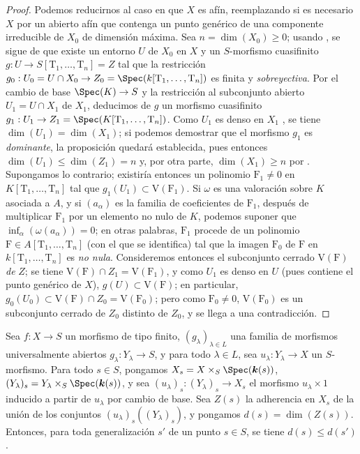 \begin{proof}
Podemos reducirnos al caso en que $X$ es afín, reemplazando si es necesario $X$ por un abierto afín que contenga un punto genérico de una componente irreducible de $X_0$ de dimensión máxima.
Sea $n=\dim(X_0)\geq 0$; usando , se sigue de  que existe un entorno $U$ de $X_0$ en $X$ y un $S$-morfismo cuasifinito $g:U\to S[\mathrm{T}_1,\ldots,\mathrm{T}_n]=Z$ tal que la restricción $g_0:U_0=U\cap X_0\to Z_0=\Spec(k[\mathrm{T}_1,\ldots,\mathrm{T}_n])$ es finita y \emph{sobreyectiva}.
Por el cambio de base $\Spec(K)\to S$ y la restricción al subconjunto abierto $U_1=U\cap X_1$ de $X_1$, deducimos de $g$ un morfismo cuasifinito $g_1:U_1\to Z_1=\Spec(K[\mathrm{T}_1,\ldots,\mathrm{T}_n])$.
Como $U_1$ es denso en $X_1$ , se tiene $\dim(U_1)=\dim(X_1)$; si podemos demostrar que el morfismo $g_1$ es \emph{dominante}, la proposición quedará establecida, pues entonces $\dim(U_1)\leq\dim(Z_1)=n$ y, por otra parte, $\dim(X_1)\geq n$ por .
Supongamos lo contrario; existiría entonces un polinomio $\mathrm{F}_1\neq 0$ en $K[\mathrm{T}_1,\ldots,\mathrm{T}_n]$ tal que $g_1(U_1)\subset\mathrm{V}(\mathrm{F}_1)$.
Si $\omega$ es una valoración sobre $K$ asociada a $A$, y si $(a_\alpha)$ es la familia de coeficientes de $\mathrm{F}_1$, después de multiplicar $\mathrm{F}_1$ por un elemento no nulo de $K$, podemos suponer que $\inf_\alpha(\omega(a_\alpha))=0$; en otras palabras, $\mathrm{F}_1$ procede de un polinomio $\mathrm{F}\in A[\mathrm{T}_1,\ldots,\mathrm{T}_n]$ (con el que se identifica) tal que la imagen $\mathrm{F}_0$ de $\mathrm{F}$ en $k[\mathrm{T}_1,\ldots,\mathrm{T}_n]$ es \emph{no nula}.
Consideremos entonces el subconjunto cerrado $\mathrm{V}(\mathrm{F})$ \emph{de} $Z$; se tiene $\mathrm{V}(\mathrm{F})\cap Z_1=\mathrm{V}(\mathrm{F}_1)$, y como $U_1$
es denso en $U$ (pues contiene el punto genérico de $X$), $g(U)\subset\mathrm{V}(\mathrm{F})$; en particular, $g_0(U_0)\subset\mathrm{V}(\mathrm{F})\cap Z_0=\mathrm{V}(\mathrm{F}_0)$; pero como $\mathrm{F}_0\neq 0$, $\mathrm{V}(\mathrm{F}_0)$ es un subconjunto cerrado de $Z_0$ distinto de $Z_0$, y se llega a una contradicción.
\end{proof}

\begin{proposition}[14.3.11]
\label{IV.14.3.11}
Sea $f:X\to S$ un morfismo de tipo finito, $(g_\lambda)_{\lambda\in L}$ una familia de morfismos universalmente abiertos $g_\lambda:Y_\lambda\to S$, y para todo $\lambda\in L$, sea $u_\lambda:Y_\lambda\to X$ un $S$-morfismo.
Para todo $s\in S$, pongamos $X_s=X\times_S\Spec(\boldsymbol{k}(s))$, $(Y_\lambda)_s=Y_\lambda\times_S\Spec(\boldsymbol{k}(s))$, y sea $(u_\lambda)_s:(Y_\lambda)_s\to X_s$ el morfismo $u_\lambda\times 1$ inducido a partir de $u_\lambda$ por cambio de base.
Sea $Z(s)$ la adherencia en $X_s$ de la unión de los conjuntos $(u_\lambda)_s((Y_\lambda)_s)$, y pongamos $d(s)=\dim(Z(s))$.
Entonces, para toda generalización $s'$ de un punto $s\in S$, se tiene $d(s)\leq d(s')$.
\end{proposition}


